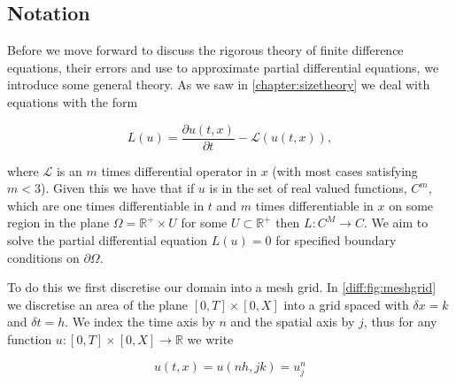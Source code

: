 \documentclass[../main.tex]{subfiles}
\begin{document}
  \subsection{Notation}
  Before we move forward to discuss the rigorous theory of finite difference equations, their errors and use to approximate partial differential equations, we introduce some general theory. As we saw in \autoref{chapter:sizetheory} we deal with equations with the form

  \begin{equation} \label{diff:eq:pdeprob}
    L(u) = \frac{\partial u(t, x)}{\partial t} - \mathcal{L}(u(t, x)),
  \end{equation}

  where $\mathcal{L}$ is an $m$ times differential operator in $x$ (with most cases satisfying $m < 3$). Given this we have that if $u$ is in the set of real valued functions, $C^m$, which are one times differentiable in $t$ and $m$ times differentiable in $x$ on some region in the plane $\Omega = \mathbb{R}^+ \times U$ for some $U \subset \mathbb{R}^+$ then $L : C^M \to C$. We aim to solve the partial differential equation $L(u) = 0$ for specified boundary conditions on $\partial \Omega$.

  To do this we first discretise our domain into a mesh grid. In \autoref{diff:fig:meshgrid} we discretise an area of the plane $[0, T] \times [0, X]$ into a grid spaced with $\delta x = k$ and $\delta t = h$. We index the time axis by $n$ and the spatial axis by $j$, thus for any function $u : [0, T] \times [0, X] \to \mathbb{R}$ we write

  \begin{equation}
    u(t, x) = u(n h, j k) = u^n_j
  \end{equation}
\end{document}

